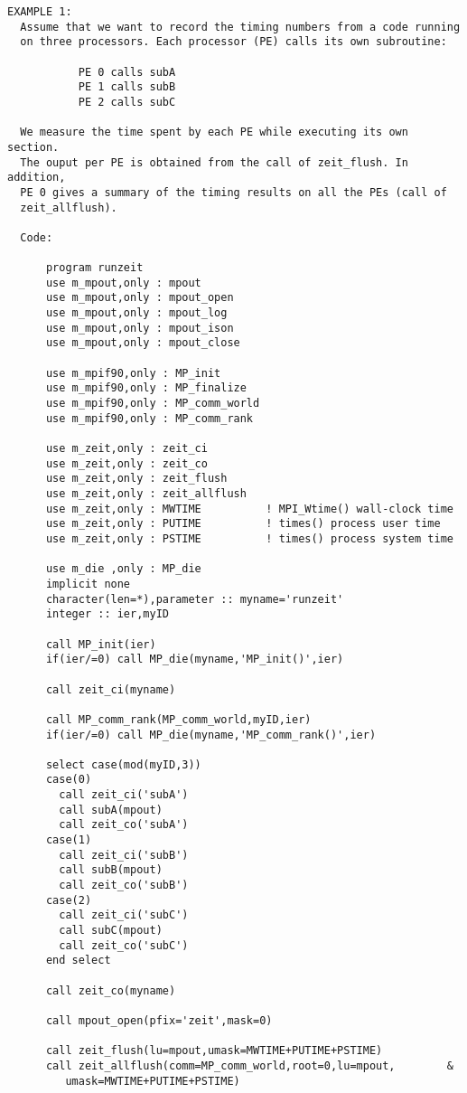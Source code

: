 \begin{verbatim}
EXAMPLE 1:
  Assume that we want to record the timing numbers from a code running
  on three processors. Each processor (PE) calls its own subroutine:

           PE 0 calls subA
           PE 1 calls subB
           PE 2 calls subC

  We measure the time spent by each PE while executing its own section.
  The ouput per PE is obtained from the call of zeit_flush. In addition,
  PE 0 gives a summary of the timing results on all the PEs (call of
  zeit_allflush). 
 
  Code:

      program runzeit
      use m_mpout,only : mpout
      use m_mpout,only : mpout_open
      use m_mpout,only : mpout_log
      use m_mpout,only : mpout_ison
      use m_mpout,only : mpout_close

      use m_mpif90,only : MP_init
      use m_mpif90,only : MP_finalize
      use m_mpif90,only : MP_comm_world
      use m_mpif90,only : MP_comm_rank

      use m_zeit,only : zeit_ci
      use m_zeit,only : zeit_co
      use m_zeit,only : zeit_flush
      use m_zeit,only : zeit_allflush
      use m_zeit,only : MWTIME          ! MPI_Wtime() wall-clock time
      use m_zeit,only : PUTIME          ! times() process user time
      use m_zeit,only : PSTIME          ! times() process system time

      use m_die ,only : MP_die
      implicit none
      character(len=*),parameter :: myname='runzeit'
      integer :: ier,myID

      call MP_init(ier)
      if(ier/=0) call MP_die(myname,'MP_init()',ier)

      call zeit_ci(myname)

      call MP_comm_rank(MP_comm_world,myID,ier)
      if(ier/=0) call MP_die(myname,'MP_comm_rank()',ier)

      select case(mod(myID,3))
      case(0)
        call zeit_ci('subA')
        call subA(mpout)
        call zeit_co('subA')
      case(1)
        call zeit_ci('subB')
        call subB(mpout)
        call zeit_co('subB')
      case(2)
        call zeit_ci('subC')
        call subC(mpout)
        call zeit_co('subC')
      end select

      call zeit_co(myname)

      call mpout_open(pfix='zeit',mask=0)

      call zeit_flush(lu=mpout,umask=MWTIME+PUTIME+PSTIME)
      call zeit_allflush(comm=MP_comm_world,root=0,lu=mpout,        &
         umask=MWTIME+PUTIME+PSTIME)


\end{verbatim}
